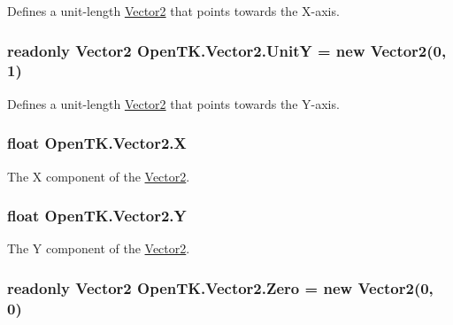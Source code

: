 Defines a unit-\/length \hyperlink{struct_open_t_k_1_1_vector2}{Vector2} that points towards the X-\/axis. 

\hypertarget{struct_open_t_k_1_1_vector2_ae71028930b0fc4172fddddad30a6cf23}{
\subsubsection[{Unit\-Y}]{\setlength{\rightskip}{0pt plus 5cm}readonly {\bf Vector2} Open\-T\-K.\-Vector2.\-Unit\-Y = new {\bf Vector2}(0, 1)\hspace{0.3cm}{\ttfamily [static]}}}\label{struct_open_t_k_1_1_vector2_ae71028930b0fc4172fddddad30a6cf23}


Defines a unit-\/length \hyperlink{struct_open_t_k_1_1_vector2}{Vector2} that points towards the Y-\/axis. 

\hypertarget{struct_open_t_k_1_1_vector2_a26626fe0414169641852bfaf089c05f0}{
\subsubsection[{X}]{\setlength{\rightskip}{0pt plus 5cm}float Open\-T\-K.\-Vector2.\-X}}\label{struct_open_t_k_1_1_vector2_a26626fe0414169641852bfaf089c05f0}


The X component of the \hyperlink{struct_open_t_k_1_1_vector2}{Vector2}. 

\hypertarget{struct_open_t_k_1_1_vector2_af6afa39de08795147e25a695472fa3a8}{
\subsubsection[{Y}]{\setlength{\rightskip}{0pt plus 5cm}float Open\-T\-K.\-Vector2.\-Y}}\label{struct_open_t_k_1_1_vector2_af6afa39de08795147e25a695472fa3a8}


The Y component of the \hyperlink{struct_open_t_k_1_1_vector2}{Vector2}. 

\hypertarget{struct_open_t_k_1_1_vector2_af9a8e6eee1e15bcc8e29d6c91a3793b4}{
\subsubsection[{Zero}]{\setlength{\rightskip}{0pt plus 5cm}readonly {\bf Vector2} Open\-T\-K.\-Vector2.\-Zero = new {\bf Vector2}(0, 0)\hspace{0.3cm}{\ttfamily [static]}}}\label{struct_open_t_k_1_1_vector2_af9a8e6eee1e15bcc8e29d6c91a3793b4}


